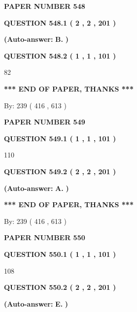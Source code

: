 \documentclass{ctexart}
\begin{document}
   
 {\textbf{ \Large{ PAPER NUMBER  548  }}}
   
   
   
   
  
  
{\textbf{\large{QUESTION
548.1 
 ( 2 , 2 , 201 )
}}}
 
 
{\textbf{(Auto-answer:}}
{\textbf{\large{
B.}}}
{\textbf{)}}
 
 
  
  
{\textbf{\large{QUESTION
548.2 
 ( 1 , 1 , 101 )
}}}

82
   
   
   
   
\vspace{1.0in} 
{\textbf{\large{ *** END OF PAPER, THANKS *** }}} 
   
   
\hspace{1.0in} By: 
 239 ( 416 ,  613 )
   
   
   
   
\newpage 
\setcounter{page}{ 
   549001 } 
   
   
 {\textbf{ \Large{ PAPER NUMBER  549  }}}
   
   
   
   
  
  
{\textbf{\large{QUESTION
549.1 
 ( 1 , 1 , 101 )
}}}

110
  
  
{\textbf{\large{QUESTION
549.2 
 ( 2 , 2 , 201 )
}}}
 
 
{\textbf{(Auto-answer:}}
{\textbf{\large{
A.}}}
{\textbf{)}}
 
 
   
   
   
   
\vspace{1.0in} 
{\textbf{\large{ *** END OF PAPER, THANKS *** }}} 
   
   
\hspace{1.0in} By: 
 239 ( 416 ,  613 )
   
   
   
   
\newpage 
\setcounter{page}{ 
   550001 } 
   
   
 {\textbf{ \Large{ PAPER NUMBER  550  }}}
   
   
   
   
  
  
{\textbf{\large{QUESTION
550.1 
 ( 1 , 1 , 101 )
}}}

108
  
  
{\textbf{\large{QUESTION
550.2 
 ( 2 , 2 , 201 )
}}}
 
 
{\textbf{(Auto-answer:}}
{\textbf{\large{
E.}}}
{\textbf{)}}
 
\end{document}
